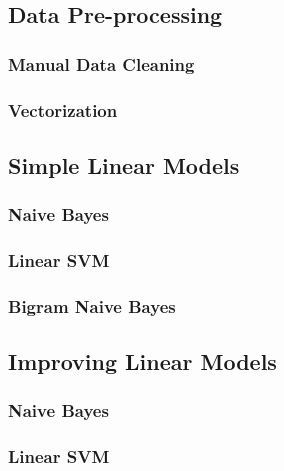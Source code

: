 \documentclass[conference]{IEEEtran}
\begin{document}
\subsection{Data Pre-processing}


\subsubsection{Manual Data Cleaning}


\subsubsection{Vectorization}


\subsection{Simple Linear Models}


\subsubsection{Naive Bayes}


\subsubsection{Linear SVM}


\subsubsection{Bigram Naive Bayes}


\subsection{Improving Linear Models}

\subsubsection{Naive Bayes}


\subsubsection{Linear SVM}
\end{document}
